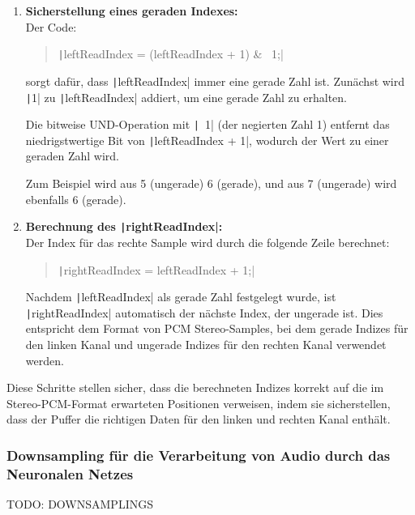 \begin{enumerate}
	\item \textbf{Sicherstellung eines geraden Indexes:} \\
	Der Code:
	\begin{quote}
		\texttt|leftReadIndex = (leftReadIndex + 1) & ~1;|
	\end{quote}
	sorgt dafür, dass \texttt|leftReadIndex| immer eine gerade Zahl ist. Zunächst wird \texttt|1| zu \texttt|leftReadIndex| addiert, um eine gerade Zahl zu erhalten. 
	
	Die bitweise UND-Operation mit \texttt|~1| (der negierten Zahl 1) entfernt das niedrigstwertige Bit von \texttt|leftReadIndex + 1|, wodurch der Wert zu einer geraden Zahl wird. 
	
	Zum Beispiel wird aus 5 (ungerade) 6 (gerade), und aus 7 (ungerade) wird ebenfalls 6 (gerade).
	
	\item \textbf{Berechnung des \texttt|rightReadIndex|:} \\
	Der Index für das rechte Sample wird durch die folgende Zeile berechnet:
	\begin{quote}
		\texttt|rightReadIndex = leftReadIndex + 1;|
	\end{quote}
	Nachdem \texttt|leftReadIndex| als gerade Zahl festgelegt wurde, ist \texttt|rightReadIndex| automatisch der nächste Index, der ungerade ist. Dies entspricht dem Format von PCM Stereo-Samples, bei dem gerade Indizes für den linken Kanal und ungerade Indizes für den rechten Kanal verwendet werden.
\end{enumerate}

Diese Schritte stellen sicher, dass die berechneten Indizes korrekt auf die im Stereo-PCM-Format erwarteten Positionen verweisen, indem sie sicherstellen, dass der Puffer die richtigen Daten für den linken und rechten Kanal enthält.


\subsubsection{Downsampling für die Verarbeitung von Audio durch das Neuronalen Netzes}
\label{sec:audio-downsampling}

TODO: DOWNSAMPLINGS



